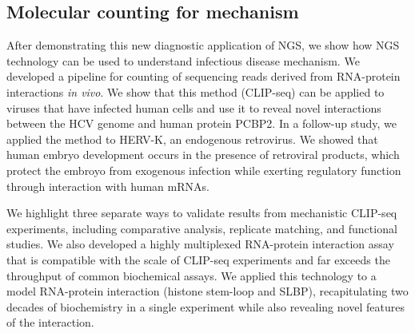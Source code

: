\subsection{Molecular counting for mechanism}

After demonstrating this new diagnostic application of NGS, we show how NGS technology can be used to understand infectious disease mechanism. We developed a pipeline for counting of sequencing reads derived from RNA-protein interactions \emph{in vivo}. We show that this method (CLIP-seq) can be applied to viruses that have infected human cells and use it to reveal novel interactions between the HCV genome and human protein PCBP2. In a follow-up study, we applied the method to HERV-K, an endogenous retrovirus. We showed that human embryo development occurs in the presence of retroviral products, which protect the embroyo from exogenous infection while exerting regulatory function through interaction with human mRNAs. 

We highlight three separate ways to validate results from mechanistic CLIP-seq experiments, including comparative analysis, replicate matching, and functional studies. We also developed a highly multiplexed RNA-protein interaction assay that is compatible with the scale of CLIP-seq experiments and far exceeds the throughput of common biochemical assays. We applied this technology to a model RNA-protein interaction (histone stem-loop and SLBP), recapitulating two decades of biochemistry in a single experiment while also revealing novel features of the interaction.  